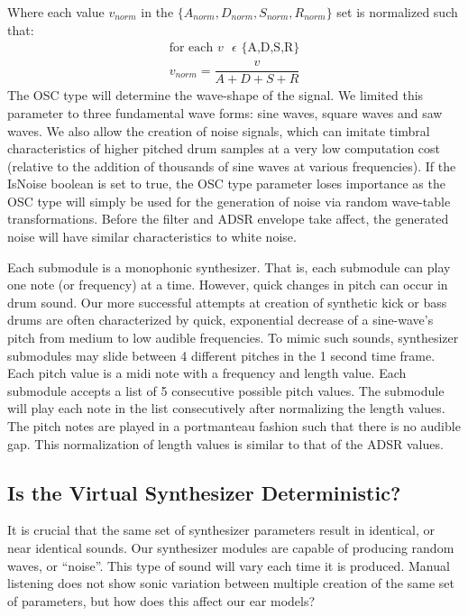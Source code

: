 \documentclass[\main/thesis.tex]{subfiles}
\begin{document}
Where each value $v_{norm}$ in the $\{A_{norm}, D_{norm},S_{norm},R_{norm}\} $ set is normalized such that:
\begin{align*}
\text{for each $v$ $\epsilon$ \{A,D,S,R\}} \\
v_{norm} = \dfrac{v}{A + D + S + R}
\end{align*}
 The OSC type will determine the wave-shape of the signal. We limited this parameter to three fundamental wave forms: sine waves, square waves and saw waves. We also allow the creation of noise signals, which can imitate timbral characteristics of higher pitched drum samples at a very low computation cost (relative to the addition of thousands of sine waves at various frequencies). If the IsNoise boolean is set to true, the OSC type parameter loses importance as the OSC type will simply be used for the generation of noise via random wave-table transformations. Before the filter and ADSR envelope take affect, the generated noise will have similar characteristics to white noise. 

Each submodule is a monophonic synthesizer. That is, each submodule can play one note (or frequency) at a time. However, quick changes in pitch can occur in drum sound. Our more successful attempts at creation of synthetic kick or bass drums are often characterized by quick, exponential decrease of a sine-wave's pitch from medium to low audible frequencies. To mimic such sounds, synthesizer submodules may slide between 4 different pitches in the 1 second time frame. Each pitch value is a midi note with a frequency and length value. Each submodule accepts a list of 5 consecutive possible pitch values. The submodule will play each note in the list consecutively after normalizing the length values. The pitch notes are played in a portmanteau fashion such that there is no audible gap. This normalization of length values is similar to that of the ADSR values. 


\subsection{Is the Virtual Synthesizer Deterministic?}
\label{chap3:synth_deterministic}
It is crucial that the same set of synthesizer parameters result in identical, or near identical sounds. Our synthesizer modules are capable of producing random waves, or \enquote{noise}. This type of sound will vary each time it is produced. Manual listening does not show sonic variation between multiple creation of the same set of parameters, but how does this affect our ear models?
\end{document}
